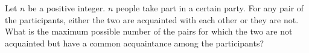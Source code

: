 Let $n$ be a positive integer. $n$ people take part in a certain party. For any pair of the participants, either the two are acquainted with each other or they are not. What is the maximum possible number of the pairs for which the two are not acquainted but have a common acquaintance among the participants?